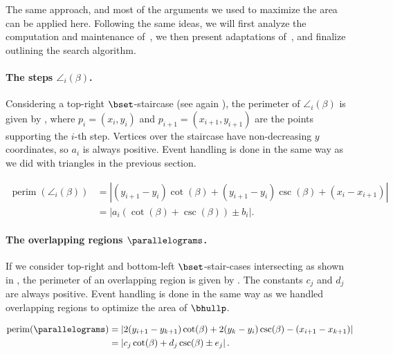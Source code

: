 \documentclass[11pt,letterpaper,english]{article}
\theoremstyle{definition}
\newcommand{\perim}{\operatorname{perim}}
\begin{document}
The same approach, and most of the arguments we used to maximize the
area can be applied here. Following the same ideas, we will first
analyze the computation and maintenance of~,
we then present adaptations of~, and
finalize outlining the search algorithm.

\paragraph{The steps $\angle_i(\beta)$.}

Considering a top-right $\bset$-staircase (see again
), the perimeter of $\angle_i(\beta)$ is given
by , where $p_i=(x_i,y_i)$ and
$p_{i+1}=(x_{i+1},y_{i+1})$ are the points supporting the $i$-th
step. Vertices over the staircase have non-decreasing $y$ coordinates,
so $a_i$ is always positive. Event handling is done in the same way as
we did with triangles in the previous section.

\begin{align}
  \label{apps:perim:eqn:step}
  \perim(\angle_i(\beta)) &= \left|
                      \left( y_{i+1}-y_i \right)\cot(\beta)
                      + \left( y_{i+1}-y_i \right)\csc(\beta)
                      + \left( x_i-x_{i+1} \right)
                      \right| \nonumber \\
                    &= \left|
                      a_i \left( \cot(\beta) + \csc(\beta) \right)
                      \pm  b_i
                      \right|.
\end{align}

\paragraph{The overlapping regions $\parallelograms$.}

If we consider top-right and bottom-left $\bset$-stair-cases
intersecting as shown in , the
perimeter of an overlapping region is given by
. The constants $c_j$ and $d_j$ are always
positive. Event handling is done in the same way as we handled
overlapping regions to optimize the area of $\bhullp$.

\begin{align}
  \label{apps:perim:eqn:or}
  \perim(\parallelograms) &= \left| 2(y_{i+1} - y_{k+1}) \cot(\beta)
                           + 2(y_{k} - y_{i})\csc(\beta)
                           - (x_{i+1} - x_{k+1}) \right| \nonumber \\
                         &= \left| c_j \cot(\beta)
                           + d_j \csc(\beta)
                           \pm e_j \right|.
\end{align}
\end{document}
